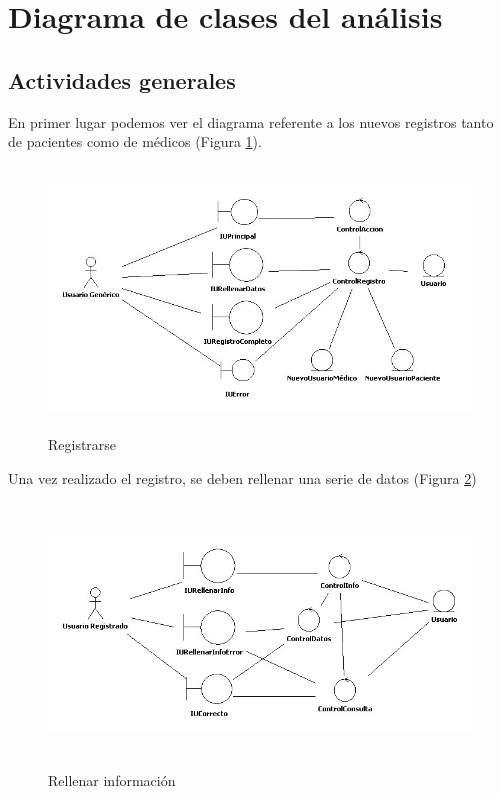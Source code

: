 \section{Diagrama de clases del análisis} %
\label{sec:diagrama_de_clases_analisis}

\subsection{Actividades generales} %
\label{sub:actividades_generales}
	
	En primer lugar podemos ver el diagrama referente a los nuevos registros tanto de pacientes como de médicos (Figura \ref{fig:col_clase7}).
	\begin{figure}[H]
	  \centering
	    \includegraphics[width=15cm, height= 7cm]{img/jpg/clases/7_Registrarse.jpg}
	  \caption{Registrarse}
	  \label{fig:col_clase7}
	\end{figure}

	Una vez realizado el registro, se deben rellenar una serie de datos (Figura \ref{fig:col_clase8})
	\begin{figure}[H]
	  \centering
	    \includegraphics[width=15cm, height=7cm]{img/jpg/clases/7_RellenarInfo.jpg}
	  \caption{Rellenar información}
	  \label{fig:col_clase8}
	\end{figure}
	
